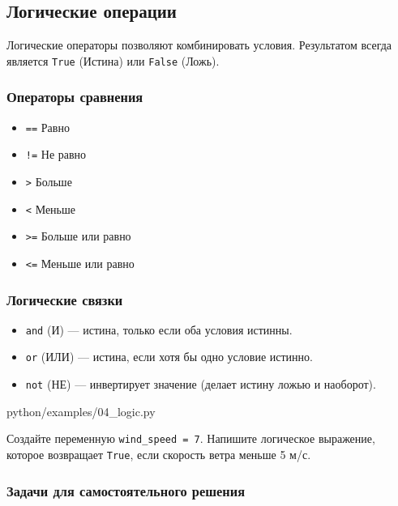 \subsection{Логические операции}

Логические операторы позволяют комбинировать условия. Результатом всегда является \texttt{True} (Истина) или \texttt{False} (Ложь).

\subsubsection*{Операторы сравнения}
\begin{itemize}
    \item \texttt{==} Равно
    \item \texttt{!=} Не равно
    \item \texttt{>} Больше
    \item \texttt{<} Меньше
    \item \texttt{>=} Больше или равно
    \item \texttt{<=} Меньше или равно
\end{itemize}

\subsubsection*{Логические связки}
\begin{itemize}
    \item \texttt{and} (И) — истина, только если оба условия истинны.
    \item \texttt{or} (ИЛИ) — истина, если хотя бы одно условие истинно.
    \item \texttt{not} (НЕ) — инвертирует значение (делает истину ложью и наоборот).
\end{itemize}

\begin{codefile}[python]{python/examples/04_logic.py}
\end{codefile}

\begin{taskbox}
Создайте переменную \texttt{wind\_speed = 7}. Напишите логическое выражение, которое возвращает \texttt{True}, если скорость ветра меньше 5 м/с.
\end{taskbox}

\subsubsection*{Задачи для самостоятельного решения}

